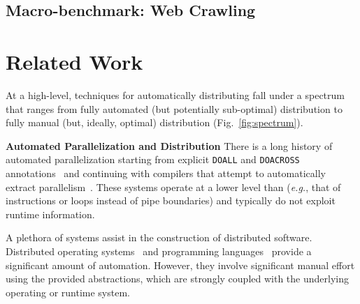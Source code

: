 \documentclass[sigplan,10pt,review,anonymous]{acmart}
\newcommand{\eg}{{\em e.g.}, }
\newcommand{\heading}[1]{\vspace{4pt}\noindent\textbf{#1}\enspace}
\newcommand{\ttt}[1]{\texttt{\small #1}}
\newcommand{\TODO}[1]{\hl{\textbf{TODO:} #1}\xspace}
\begin{document}
\subsection{Macro-benchmark: Web Crawling}
\label{macro2}

\section{Related Work}
\label{related}

At a high-level, techniques for automatically distributing fall under a spectrum that ranges from fully automated (but potentially sub-optimal) distribution to fully manual (but, ideally, optimal) distribution (Fig.~\ref{fig:spectrum}).

\heading{Automated Parallelization and Distribution}
There is a long history of automated parallelization starting from explicit \ttt{DOALL} and \ttt{DOACROSS} annotations~\cite{par1, par2} and continuing with compilers that attempt to automatically extract parallelism~\cite{padua1993polaris,hall1996maximizing}.
These systems operate at a lower level than \sys (\eg that of instructions or loops instead of pipe boundaries) and typically do not exploit runtime information.

A plethora of systems assist in the construction of distributed software.
Distributed operating systems~\cite{rashid1981accent, walker1983locus, ousterhout1988sprite, mullender1990amoeba, pike1990plan9, rozier1991overview, dorward1997inferno, barak1998mosix, schwarzkopf2013dios, sacha2013osprey} and programming languages~\cite{erlang:96, acute:05, mace:07, cloudhaskell:11}
provide a significant amount of automation. %
However, they involve significant manual effort using the provided abstractions, which are strongly coupled with the underlying operating or runtime system.
\end{document}
